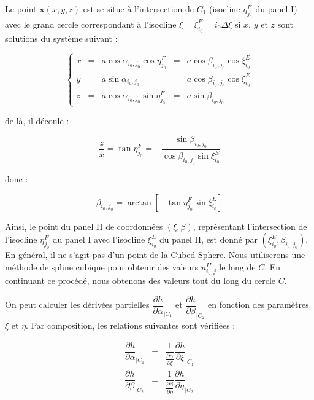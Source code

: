 Le point $\mathbf{x}(x,y,z)$ est se situe à l'intersection de $C_1$ (isocline $\eta^F_{j_0}$ du panel I) avec le grand cercle correspondant à l'isocline $\xi = \xi^E_{i_0} = i_0 \Delta \xi$ si $x$, $y$ et $z$ sont solutions du système suivant :

\begin{equation}
\left\lbrace
\begin{array}{rcccl}
x & = & a \cos \alpha_{i_0, j_0} \cos \eta^F_{j_0} & = & a \cos \beta_{i_0, j_0} \cos \xi^E_{i_0} \\
y & = & a \sin \alpha_{i_0, j_0} & = & a \cos \beta_{i_0, j_0} \cos \xi^E_{i_0} \\
z & = & a \cos \alpha_{i_0, j_0} \sin \eta^F_{j_0}  & = & a \sin \beta_{i_0, j_0}
\end{array}
\right.
\end{equation}

de là, il découle :

\begin{equation}
\dfrac{z}{x} = \tan \eta^F_{j_0} = - \dfrac{\sin \beta_{i_0, j_0}}{\cos \beta_{i_0, j_0} \sin \xi^E_{i_0}}
\end{equation}

donc :

\begin{equation}
\beta_{i_0, j_0} = \arctan \left[ - \tan \eta^F_{j_0} \sin \xi^E_{i_0} \right]
\label{eq:coord_cross}
\end{equation}

Ainsi, le point du panel II de coordonnées $(\xi, \beta)$, représentant l'intersection de l'isocline $\eta^F_{j_0}$ du panel I avec l'isocline $\xi_{i_0}^E$ du panel II, est donné par $(\xi^E_{i_0}, \beta_{i_0, j_0})$. En général, il ne s'agit pas d'un point de la Cubed-Sphere. Nous utiliserons une méthode de spline cubique pour obtenir des valeurs $u_{i_0,j}^{II}$ le long de $C$.
En continuant ce procédé, nous obtenons des valeurs tout du long du cercle $C$.







On peut calculer les dérivées partielles $\dfrac{\partial h}{\partial \alpha}_{|C_1}$ et $\dfrac{\partial h}{\partial \beta}_{|C_2}$ en fonction des paramètres $\xi$ et $\eta$. Par composition, les relations suivantes sont vérifiées :

\begin{equation}
\begin{array}{rcl}
\dfrac{\partial h}{\partial \alpha}_{|C_1} & = &  \dfrac{1}{\frac{\partial \alpha}{\partial \xi}} \dfrac{\partial h}{\partial \xi}_{|C_1} \\
\dfrac{\partial h}{\partial \beta}_{|C_2} & = &  \dfrac{1}{\frac{\partial \beta}{\partial \eta}} \dfrac{\partial h}{\partial \eta}_{|C_2} \\
\end{array}
\label{eq: derivee partiel link}
\end{equation}






